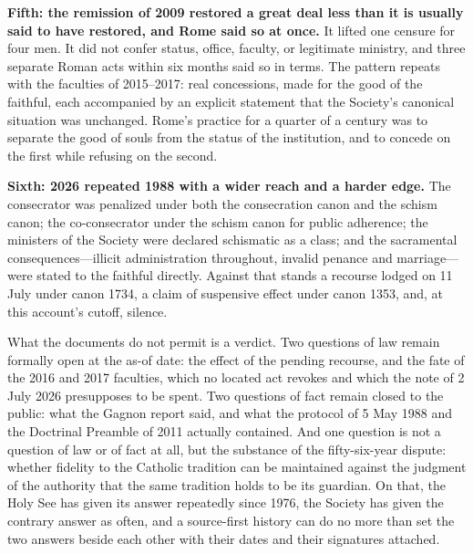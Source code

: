 \textbf{Fifth: the remission of 2009 restored a great deal less than it
is usually said to have restored, and Rome said so at once.} It lifted
one censure for four men. It did not confer status, office, faculty, or
legitimate ministry, and three separate Roman acts within six months said
so in terms. The pattern repeats with the faculties of 2015--2017: real
concessions, made for the good of the faithful, each accompanied by an
explicit statement that the Society's canonical situation was unchanged.
Rome's practice for a quarter of a century was to separate the good of
souls from the status of the institution, and to concede on the first
while refusing on the second.

\textbf{Sixth: 2026 repeated 1988 with a wider reach and a harder edge.}
The consecrator was penalized under both the consecration canon and the
schism canon; the co-consecrator under the schism canon for public
adherence; the ministers of the Society were declared schismatic as a
class; and the sacramental consequences---illicit administration
throughout, invalid penance and marriage---were stated to the faithful
directly. Against that stands a recourse lodged on 11 July under canon
1734, a claim of suspensive effect under canon 1353, and, at this
account's cutoff, silence.

What the documents do not permit is a verdict. Two questions of law
remain formally open at the as-of date: the effect of the pending
recourse, and the fate of the 2016 and 2017 faculties, which no located
act revokes and which the note of 2 July 2026 presupposes to be spent.
Two questions of fact remain closed to the public: what the Gagnon
report said, and what the protocol of 5 May 1988 and the Doctrinal
Preamble of 2011 actually contained. And one question is not a question
of law or of fact at all, but the substance of the fifty-six-year
dispute: whether fidelity to the Catholic tradition can be maintained
against the judgment of the authority that the same tradition holds to be
its guardian. On that, the Holy See has given its answer repeatedly since
1976, the Society has given the contrary answer as often, and a
source-first history can do no more than set the two answers beside each
other with their dates and their signatures attached.

